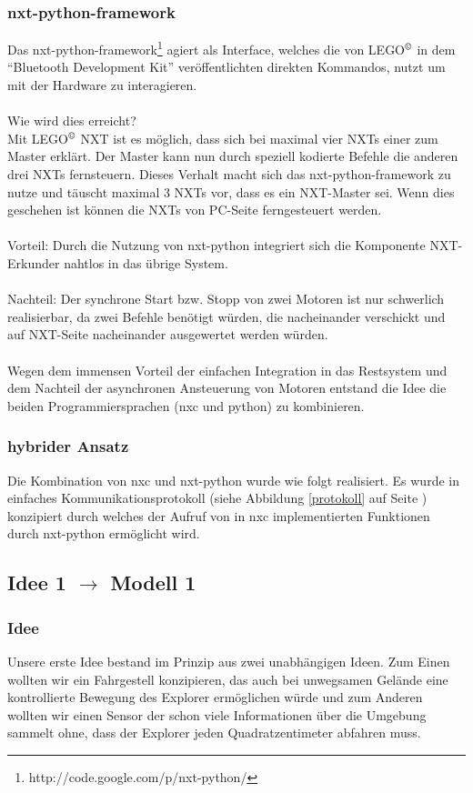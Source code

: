 \documentclass[10pt,a4paper]{scrartcl}
\begin{document}
\subsubsection{nxt-python-framework}
Das nxt-python-framework\footnote{http://code.google.com/p/nxt-python/} agiert als Interface, welches die von LEGO$^\copyright$ in dem "`Bluetooth Development Kit"' veröffentlichten direkten Kommandos, nutzt um mit der Hardware zu interagieren.\\
\\
Wie wird dies erreicht?\\
Mit LEGO$^\copyright$ NXT ist es möglich, dass sich bei maximal vier NXTs einer zum Master erklärt. Der Master kann nun durch speziell kodierte Befehle die anderen drei NXTs fernsteuern. Dieses Verhalt macht sich das nxt-python-framework zu nutze und täuscht maximal 3 NXTs vor, dass es ein NXT-Master sei. Wenn dies geschehen ist können die NXTs von PC-Seite ferngesteuert werden.\\
\\
Vorteil: Durch die Nutzung von nxt-python integriert sich die Komponente NXT-Erkunder nahtlos in das übrige System.\\
\\
Nachteil: Der synchrone Start bzw. Stopp von zwei Motoren ist nur schwerlich realisierbar, da zwei Befehle benötigt würden, die nacheinander verschickt und auf NXT-Seite nacheinander ausgewertet werden würden. \\
\\
Wegen dem immensen Vorteil der einfachen Integration in das Restsystem und dem Nachteil der asynchronen Ansteuerung von Motoren entstand die Idee die beiden Programmiersprachen (nxc und python) zu kombinieren.
\subsubsection{hybrider Ansatz}
Die Kombination von nxc und nxt-python wurde wie folgt realisiert. Es wurde in einfaches Kommunikationsprotokoll (siehe Abbildung \ref{protokoll} auf Seite \pageref{protokoll}) konzipiert durch welches der Aufruf von in nxc implementierten Funktionen durch nxt-python ermöglicht wird.

\subsection{Idee 1 $\rightarrow$ Modell 1}%
\subsubsection{Idee}
Unsere erste Idee bestand im Prinzip aus zwei unabhängigen Ideen. Zum Einen wollten wir ein Fahrgestell konzipieren, das auch bei unwegsamen Gelände eine kontrollierte Bewegung des Explorer ermöglichen würde und zum Anderen wollten wir einen Sensor der schon viele Informationen über die Umgebung sammelt ohne, dass der Explorer jeden Quadratzentimeter abfahren muss.
\end{document}
